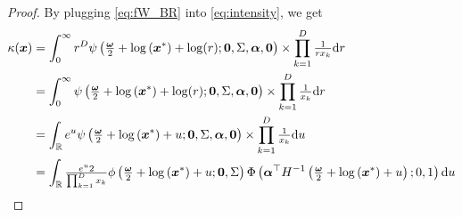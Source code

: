 \documentclass[12pt]{article}
\begin{document}
\begin{proof}
By plugging \eqref{eq:fW_BR} into \eqref{eq:intensity}, we get
%
\begin{align*}
\kappa(\bm x) &= \int_0^\infty r^D \psi\left( {\textstyle{\bm\omega\over2}} + \log\left(\bm x^*\right) + \log(r); \bm 0, \Sigma, \bm \alpha, \bm 0\right) \times \prod_{k=1}^D {\textstyle{1\over r x_k}} \text dr \\
&= \int_0^\infty \psi\left( {\textstyle{\bm\omega\over2}} + \log\left(\bm x^*\right) + \log(r); \bm 0, \Sigma, \bm \alpha, \bm 0\right) \times \prod_{k=1}^D {\textstyle{1\over x_k}} \text dr \\
&= \int_{\mathbb{R}} e^{u} \psi\left( {\textstyle{\bm\omega\over2}} + \log\left(\bm x^*\right) + u; \bm 0, \Sigma, \bm \alpha, \bm 0\right) \times \prod_{k=1}^D {\textstyle{1\over x_k}} \text du \\
&= \int_{\mathbb{R}} {\textstyle{e^{u} 2\over\prod_{k=1}^D x_k}} \phi\left( {\textstyle{\bm\omega\over2}} + \log\left(\bm x^*\right) + u; \bm 0, \Sigma\right) \Phi\left( \bm \alpha^\top H^{-1} \left( {\textstyle{\bm\omega\over2}} + \log\left(\bm x^*\right) + u \right); 0, 1\right) \text du \\
\end{align*}


\end{proof}
\end{document}
